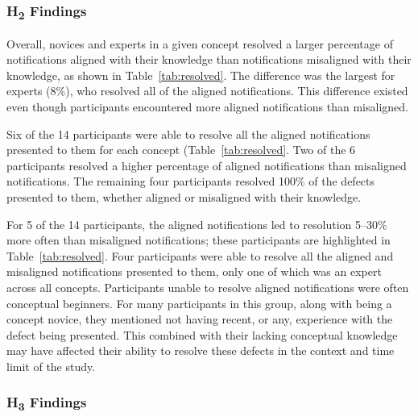 \subsubsection*{H\textsubscript{2} Findings}

Overall, novices and experts in a given concept resolved a larger percentage of notifications aligned with their knowledge than notifications misaligned with their knowledge, as shown in Table~\ref{tab:resolved}.
The difference was the largest for experts (8\%), who resolved all of the aligned notifications.
This difference existed even though participants encountered more aligned notifications than misaligned.

Six of the 14 participants were able to resolve all the aligned notifications presented to them for each concept (Table~\ref{tab:resolved}. 
Two of the 6 participants resolved a higher percentage of aligned notifications than misaligned notifications.
The remaining four participants resolved 100\% of the defects presented to them, whether aligned or misaligned with their knowledge.

For 5 of the 14 participants, the aligned notifications led to resolution 5--30\% more often than misaligned notifications; these participants are highlighted in Table~\ref{tab:resolved}.
Four participants were able to resolve all the aligned and misaligned notifications presented to them, only one of which was an expert across all concepts.
Participants unable to resolve aligned notifications were often conceptual beginners. 
For many participants in this group, along with being a concept novice, they mentioned not having recent, or any, experience with the defect being presented. This combined with their lacking conceptual knowledge may have affected their ability to resolve these defects in the context and time limit of the study.

\vspace{1em}
\vspace{1em}

\subsubsection*{H\textsubscript{3} Findings}

